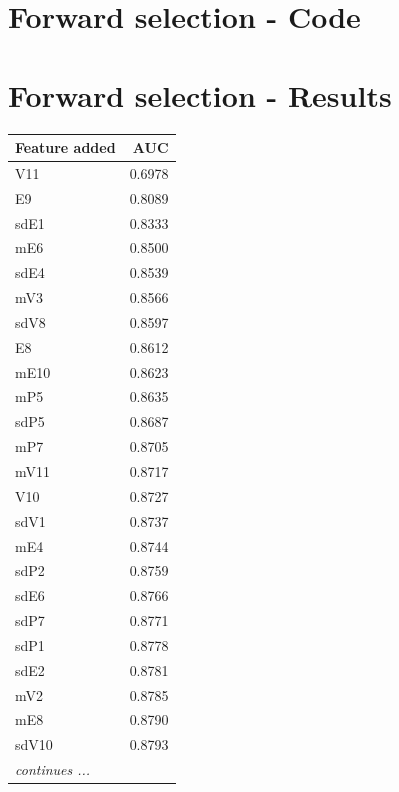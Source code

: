 \clearpage

\section{Forward selection - Code} %
\label{app:source-forward-selection}

\clearpage

\section{Forward selection - Results} %
\label{app:result-forward-selection}
{\small\sffamily\centering
\begin{minipage}[t]{40mm}
\vspace{0pt}
\begin{tabularx}{40mm}{ l R }
Feature added & AUC \\\hline
V11 & 0.6978 \\
E9 & 0.8089 \\
sdE1 & 0.8333 \\
mE6 & 0.8500 \\
sdE4 & 0.8539 \\
mV3 & 0.8566 \\
sdV8 & 0.8597 \\
E8 & 0.8612 \\
mE10 & 0.8623 \\
mP5 & 0.8635 \\
sdP5 & 0.8687 \\
mP7 & 0.8705 \\
mV11 & 0.8717 \\
V10 & 0.8727 \\
sdV1 & 0.8737 \\
mE4 & 0.8744 \\
sdP2 & 0.8759 \\
sdE6 & 0.8766 \\
sdP7 & 0.8771 \\
sdP1 & 0.8778 \\
sdE2 & 0.8781 \\
mV2 & 0.8785 \\
mE8 & 0.8790 \\
sdV10 & 0.8793 \\
{\itshape continues ...} & 
\end{tabularx}
\end{minipage}
\hspace{35mm}
\begin{minipage}[t]{40mm}

\end{minipage}}
